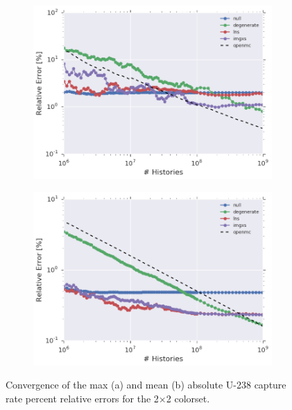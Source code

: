 \documentclass[12pt,twoside]{mitthesis-exec}
\begin{document}
\begin{figure}[h!]
\centering
\begin{subfigure}{\textwidth}
  \centering
  \includegraphics[width=0.9\linewidth]{figures/results/convergence/reflector/max-capt-err-evo-exec-summary}
  \caption{}
  \label{fig:refl-max-converge}
\end{subfigure}
\begin{subfigure}{\textwidth}
  \centering
  \includegraphics[width=0.9\linewidth]{figures/results/convergence/reflector/mean-capt-err-evo-exec-summary}
  \caption{}
  \label{fig:refl-mean-converge}
\end{subfigure}
\vspace{2mm}
\caption[Fission rate covergence for the 2$\times$2 colorset]{Convergence of the max (a) and mean (b) absolute U-238 capture rate percent relative errors for the 2$\times$2 colorset.}
\label{fig:refl-capture-converge}
\end{figure}
\end{document}
